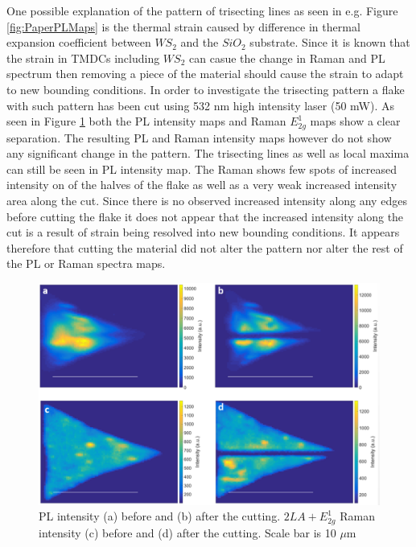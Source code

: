 \documentclass[12pt]{article}
\begin{document}
One possible explanation of the pattern of trisecting lines as seen in e.g. Figure \ref{fig:PaperPLMaps} is the thermal strain caused by difference in thermal expansion coefficient between $WS_2$ and the $SiO_2$ substrate. Since it is known that the strain in TMDCs including $WS_2$ can casue the change in Raman and PL spectrum \cite{Liu2014}\cite{Hui2013} then removing a piece of the material should cause the strain to adapt to new bounding conditions. In order to investigate the trisecting pattern a flake with such pattern has been cut using 532 nm high intensity laser (50 mW). As seen in Figure \ref{fig:PaperSIMapsCutting} both the PL intensity maps and Raman $E^1_{2g}$ maps show a clear separation. The resulting PL and Raman intensity maps however do not show any significant change in the pattern. The trisecting lines as well as local maxima can still be seen in PL intensity map. The Raman shows few spots of increased intensity on of the halves of the flake as well as a very weak increased intensity area along the cut. Since there is no observed increased intensity along any edges before cutting the flake it does not appear that the increased intensity along the cut is a result of strain being resolved into new bounding conditions. It appears therefore that cutting the material did not alter the pattern nor alter the rest of the PL or Raman spectra maps.

\begin{figure}[h]
	\begin{center}
		\includegraphics[scale=0.3]{PaperSIMapsCutting.png}
		\caption{PL intensity (a) before and (b) after the cutting. $2LA+E^1_{2g}$ Raman intensity (c) before and (d) after the cutting. Scale bar is 10 $\mu$m}
		\label{fig:PaperSIMapsCutting}
	\end{center}
\end{figure}
\end{document}

